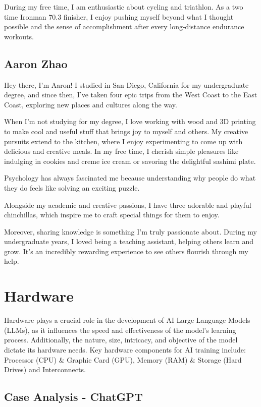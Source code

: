 \documentclass[
]{book}
\begin{document}
During my free time, I am enthusiastic about cycling and triathlon. As a two time Ironman 70.3 finisher, I enjoy pushing myself beyond what I thought possible and the sense of accomplishment after every long-distance endurance workouts.

\hypertarget{aaron-zhao}{%
\section{Aaron Zhao}\label{aaron-zhao}}

Hey there, I'm Aaron! I studied in San Diego, California for my undergraduate degree, and since then, I've taken four epic trips from the West Coast to the East Coast, exploring new places and cultures along the way.

When I'm not studying for my degree, I love working with wood and 3D printing to make cool and useful stuff that brings joy to myself and others. My creative pursuits extend to the kitchen, where I enjoy experimenting to come up with delicious and creative meals. In my free time, I cherish simple pleasures like indulging in cookies and creme ice cream or savoring the delightful sashimi plate.

Psychology has always fascinated me because understanding why people do what they do feels like solving an exciting puzzle.

Alongside my academic and creative passions, I have three adorable and playful chinchillas, which inspire me to craft special things for them to enjoy.

Moreover, sharing knowledge is something I'm truly passionate about. During my undergraduate years, I loved being a teaching assistant, helping others learn and grow. It's an incredibly rewarding experience to see others flourish through my help.

\hypertarget{hardware}{%
\chapter{Hardware}\label{hardware}}

Hardware plays a crucial role in the development of AI Large Language Models (LLMs), as it influences the speed and effectiveness of the model's learning process. Additionally, the nature, size, intricacy, and objective of the model dictate its hardware needs. Key hardware components for AI training include: Processor (CPU) \& Graphic Card (GPU), Memory (RAM) \& Storage (Hard Drives) and Interconnects.

\hypertarget{case-analysis---chatgpt}{%
\section{Case Analysis - ChatGPT}\label{case-analysis---chatgpt}}
\end{document}
